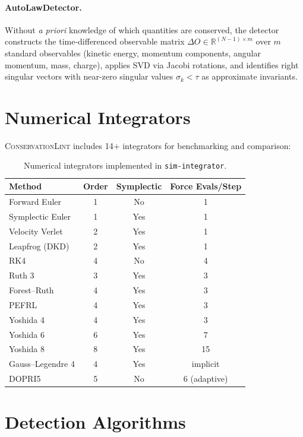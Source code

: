 \documentclass[11pt,a4paper]{article}
\begin{document}
\paragraph{AutoLawDetector.} Without \emph{a priori} knowledge of which quantities are conserved, the detector constructs the time-differenced observable matrix $\Delta O \in \mathbb{R}^{(N-1) \times m}$ over $m$ standard observables (kinetic energy, momentum components, angular momentum, mass, charge), applies SVD via Jacobi rotations, and identifies right singular vectors with near-zero singular values $\sigma_k < \tau$ as approximate invariants.

\section{Numerical Integrators}
\label{sec:integrators}

\textsc{ConservationLint} includes 14+ integrators for benchmarking and comparison:

\begin{table}[h]
\centering
\caption{Numerical integrators implemented in \texttt{sim-integrator}.}
\label{tab:integrators}
\begin{tabular}{lccc}
\toprule
\textbf{Method} & \textbf{Order} & \textbf{Symplectic} & \textbf{Force Evals/Step} \\
\midrule
Forward Euler & 1 & No & 1 \\
Symplectic Euler & 1 & Yes & 1 \\
Velocity Verlet & 2 & Yes & 1 \\
Leapfrog (DKD) & 2 & Yes & 1 \\
RK4 & 4 & No & 4 \\
Ruth 3 & 3 & Yes & 3 \\
Forest--Ruth~\citep{forest1990} & 4 & Yes & 3 \\
PEFRL~\citep{omelyan2002} & 4 & Yes & 3 \\
Yoshida 4~\citep{yoshida1990} & 4 & Yes & 3 \\
Yoshida 6 & 6 & Yes & 7 \\
Yoshida 8 & 8 & Yes & 15 \\
Gauss--Legendre 4 & 4 & Yes & implicit \\
DOPRI5 & 5 & No & 6 (adaptive) \\
\bottomrule
\end{tabular}
\end{table}

\section{Detection Algorithms}
\label{sec:detection}
\end{document}
